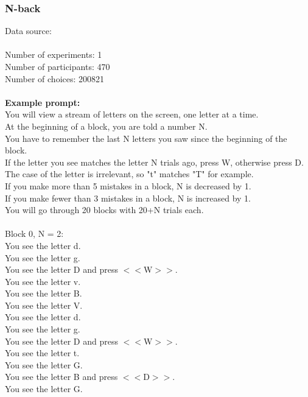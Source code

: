 \documentclass[pdflatex,sn-nature]{sn-jnl}%
\theoremstyle{thmstyleone}%
\theoremstyle{thmstyletwo}%
\theoremstyle{thmstylethree}%
\begin{document}
\subsubsection*{N-back}
Data source: \cite{enkavi2019large} \\ $~$ \\
Number of experiments: 1 $~$\\ 
Number of participants: 470 $~$\\ 
Number of choices: 200821 $~$\\ 
 $~$\\ 
\textbf{Example prompt:}
 $~$\\ 
You will view a stream of letters on the screen, one letter at a time. $~$\\ 
At the beginning of a block, you are told a number N. $~$\\ 
You have to remember the last N letters you saw since the beginning of the block. $~$\\ 
If the letter you see matches the letter N trials ago, press W, otherwise press D. $~$\\ 
The case of the letter is irrelevant, so "t" matches "T" for example. $~$\\ 
If you make more than 5 mistakes in a block, N is decreased by 1. $~$\\ 
If you make fewer than 3 mistakes in a block, N is increased by 1. $~$\\ 
You will go through 20 blocks with 20+N trials each. $~$\\ 
     $~$\\ 
Block 0, N = 2: $~$\\ 
You see the letter d. $~$\\ 
You see the letter g. $~$\\ 
You see the letter D and press $<<$W$>>$. $~$\\ 
You see the letter v. $~$\\ 
You see the letter B. $~$\\ 
You see the letter V. $~$\\ 
You see the letter d. $~$\\ 
You see the letter g. $~$\\ 
You see the letter D and press $<<$W$>>$. $~$\\ 
You see the letter t. $~$\\ 
You see the letter G. $~$\\ 
You see the letter B and press $<<$D$>>$. $~$\\ 
You see the letter G. $~$\\ 
\end{document}
